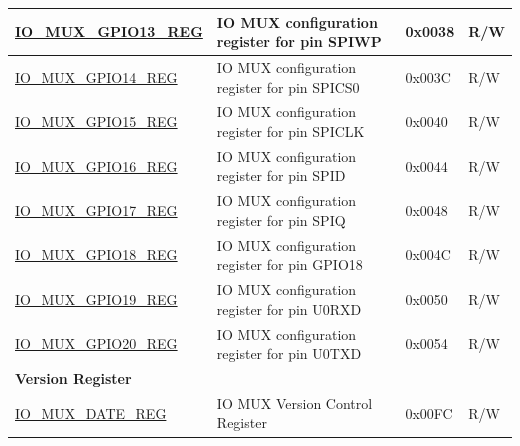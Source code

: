\begin{longtable}{ | p{6cm} | p{7.2cm} | p{1.3cm} | p{1cm} | }
\hyperref[regdesc:IOMUXGPIONREG]{IO\_MUX\_GPIO13\_REG} & IO MUX configuration register for pin SPIWP & 0x0038 & R/W \\ \hline
\hyperref[regdesc:IOMUXGPIONREG]{IO\_MUX\_GPIO14\_REG} & IO MUX configuration register for pin SPICS0 & 0x003C & R/W \\ \hline
\hyperref[regdesc:IOMUXGPIONREG]{IO\_MUX\_GPIO15\_REG} & IO MUX configuration register for pin SPICLK & 0x0040 & R/W \\ \hline
\hyperref[regdesc:IOMUXGPIONREG]{IO\_MUX\_GPIO16\_REG} & IO MUX configuration register for pin SPID & 0x0044 & R/W \\ \hline
\hyperref[regdesc:IOMUXGPIONREG]{IO\_MUX\_GPIO17\_REG} & IO MUX configuration register for pin SPIQ & 0x0048 & R/W \\ \hline
\hyperref[regdesc:IOMUXGPIONREG]{IO\_MUX\_GPIO18\_REG} & IO MUX configuration register for pin GPIO18 & 0x004C & R/W \\ \hline
\hyperref[regdesc:IOMUXGPIONREG]{IO\_MUX\_GPIO19\_REG} & IO MUX configuration register for pin U0RXD & 0x0050 & R/W \\ \hline
\hyperref[regdesc:IOMUXGPIONREG]{IO\_MUX\_GPIO20\_REG} & IO MUX configuration register for pin U0TXD & 0x0054 & R/W \\ \hline
\multicolumn{4}{|l|}{\textbf{Version Register}} \\ \hline
\hyperref[regdesc:IOMUXDATEREG]{IO\_MUX\_DATE\_REG} & IO MUX Version Control Register & 0x00FC & R/W \\ \hline
\end{longtable}
